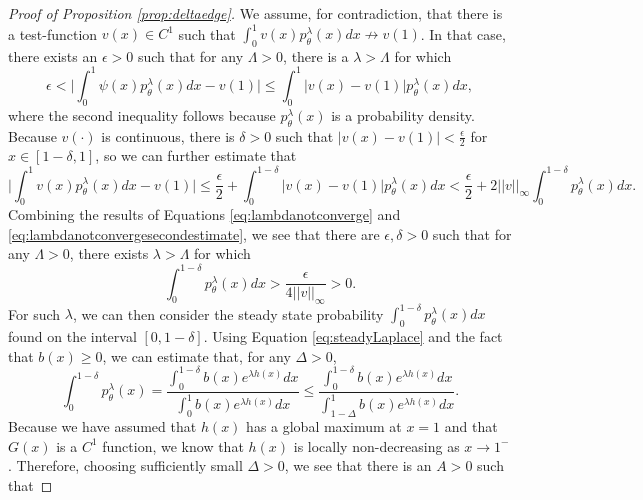 \documentclass[11pt]{article}
\numberwithin{equation}{section}
\begin{document}
{\begin{proof} [Proof of Proposition \ref{prop:deltaedge}]
 We assume, for contradiction, that there is a test-function $v(x) \in C^1$ such that $\int_0^1 v(x) p^{\lambda}_{\theta}(x) dx \not\to v(1)$. In that case, there exists an $\epsilon > 0$ such that for any $\Lambda > 0$, there is a $\lambda > \Lambda$ for which
 \begin{equation}\label{eq:lambdanotconverge}
    \epsilon <  \bigg| \int_0^1 \psi(x) p^{\lambda}_{\theta}(x) dx - v(1) \bigg| \leq \int_0^1 |v(x) - v(1) | p^{\lambda}_{\theta}(x) dx,
 \end{equation}
 where the second inequality follows because $p^{\lambda}_{\theta}(x)$ is a probability density. Because $v(\cdot)$ is continuous, there is $ \delta > 0$ such that $|v(x) - v(1)| < \frac{\epsilon}{2}$ for $x \in [1-\delta,1]$, so we can further estimate that %
 \begin{equation} \label{eq:lambdanotconvergesecondestimate}
   \bigg| \int_0^1 v(x) p^{\lambda}_{\theta}(x) dx - v(1) \bigg| \leq 
   \frac{\epsilon}{2} + \int_{0}^{1-\delta} |v(x) - v(1) | p^{\lambda}_{\theta}(x) dx   < \frac{\epsilon}{2} + 2 ||v||_{\infty} \int_0^{1 - \delta} p^{\lambda}_{\theta}(x) dx .
 \end{equation}
 Combining the results of Equations \ref{eq:lambdanotconverge} and \ref{eq:lambdanotconvergesecondestimate}, we see that there are $\epsilon,\delta > 0$ such that for any $\Lambda > 0$, there exists $\lambda > \Lambda$ for which 
 \begin{equation} \label{eq:probless1minusdelta}
     \int_{0}^{1-\delta} p^{\lambda}_{\theta}(x) dx > \frac{\epsilon}{4 ||v||_{\infty}} > 0.
 \end{equation}
 For such $\lambda$, we can then consider the steady state probability $\int_0^{1-\delta} p^{\lambda}_{\theta}(x) dx$ found on the interval $[0,1-\delta]$. Using Equation \eqref{eq:steadyLaplace} and the fact that $b(x) \geq 0$, we can estimate that, for any $\Delta > 0$,
 \begin{equation} \label{eq:deltaintervalinequality}
     \int_0^{1-\delta} p^{\lambda}_{\theta}(x) = \frac{\int_0^{1-\delta} b(x) e^{\lambda h(x)} dx}{\int_0^{1} b(x) e^{\lambda h(x)} dx} \leq  \frac{\int_0^{1-\delta} b(x) e^{\lambda h(x)} dx}{\int_{1-\Delta}^{1} b(x) e^{\lambda h(x)} dx}.
 \end{equation}
 Because we have assumed that $h(x)$ has a global maximum at $x = 1$ and that $G(x)$ is a $C^1$ function, we know that $h(x)$ is locally non-decreasing as $x \to 1^-$. Therefore, choosing sufficiently small $\Delta > 0$, we see that there is an $A > 0$ such that  

\end{proof}}
\end{document}
